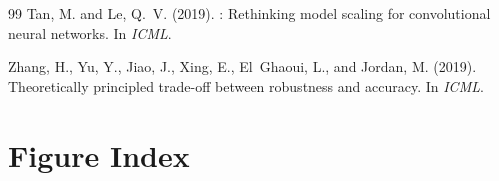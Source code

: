\documentclass[12pt,a4paper]{article}
\begin{document}
\begin{thebibliography}{99}
Tan, M. and Le, Q.~V. (2019).
: Rethinking model scaling for convolutional neural
  networks.
\newblock In \emph{ICML}.

Zhang, H., Yu, Y., Jiao, J., Xing, E., El~Ghaoui, L., and Jordan, M. (2019).
\newblock Theoretically principled trade-off between robustness and accuracy.
\newblock In \emph{ICML}.

\end{thebibliography}

\newpage
\appendix

\section{Figure Index}
\label{app:figures}
\end{document}
